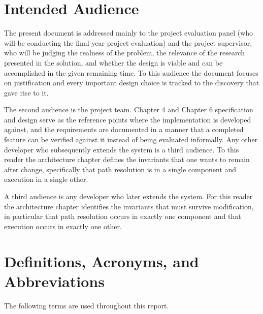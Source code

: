 \documentclass{FastFyp}
\begin{document}
\section{Intended Audience}
The present document is addressed mainly to the project evaluation panel (who will be conducting the final year project evaluation) and the project supervisor, who will be judging the realness of the problem, the relevance of the research presented in the solution, and whether the design is viable and can be accomplished in the given remaining time. To this audience the document focuses on justification and every important design choice is tracked to the discovery that gave rise to it.

The second audience is the project team. Chapter 4 and Chapter 6 specification and design serve as the reference points where the implementation is developed against, and the requirements are documented in a manner that a completed feature can be verified against it instead of being evaluated informally. Any other developer who subsequently extends the system is a third audience. To this reader the architecture chapter defines the invariants that one wants to remain after change, specifically that path resolution is in a single component and execution in a single other.

A third audience is any developer who later extends the system. For this reader the architecture chapter identifies the invariants that must survive modification, in particular that path resolution occurs in exactly one component and that execution occurs in exactly one other.

\section{Definitions, Acronyms, and Abbreviations}
The following terms are used throughout this report.
\end{document}
